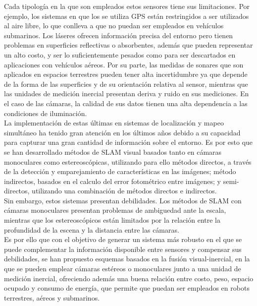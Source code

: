 {Cada tipología en la que son empleados estos sensores tiene sus limitaciones. Por ejemplo, los sistemas en que los se utiliza GPS están restringidos a ser utilizados al aire libre, lo que conlleva a que no puedan ser empleados en vehículos submarinos. Los láseres ofrecen información precisa del entorno pero tienen problemas en superficies reflectivas o absorbentes, además que pueden representar un alto costo,  y  ser lo suficientemente pesados como para ser descartados en aplicaciones con  vehículos aéreos. Por su parte, las medidas de sonares que son aplicados en espacios terrestres pueden tener alta incertidumbre ya que depende de la forma de las superficies y de su orientación relativa al sensor, mientras que las unidades de medición inercial presentan deriva y ruido en sus mediciones. En el caso de las cámaras, la  calidad de sus datos tienen una alta dependencia a las condiciones de iluminación. \\

La implementación de estas últimas en sistemas de localización y mapeo simultáneo ha tenido gran atención en los últimos años debido a su capacidad para capturar una gran cantidad de información sobre el entorno. Es por esto que se han desarrollado métodos de SLAM visual basados tanto en cámaras monoculares como estereoscópicas, utilizando para ello métodos directos, a través de la detección y emparejamiento de características en las imágenes; método indirectos, basados en el calculo del error fotométrico entre imágenes; y semi-directos, utilizando una combinación de métodos directos e indirectos.\\

Sin embargo, estos sistemas presentan debilidades. Los métodos de SLAM con cámaras monoculares presentan problemas de ambiguedad ante la escala, mientras que  los estereoscópicos están limitados por la relación entre la profundidad de la escena y la distancia entre las cámaras. \\

Es por ello que con el objetivo de generar un sistema más robusto en el que se puede complementar la información disponible entre sensores y compensar sus debilidades, se han propuesto esquemas basados en la fusión visual-inercial, en la que se pueden emplear cámaras estéreos o monoculares junto a una unidad de medición inercial, ofreciendo además una buena relación entre costo, peso, espacio ocupado y consumo de energía, que permite que puedan ser empleados en robots terrestres, aéreos y submarinos.\\

}
